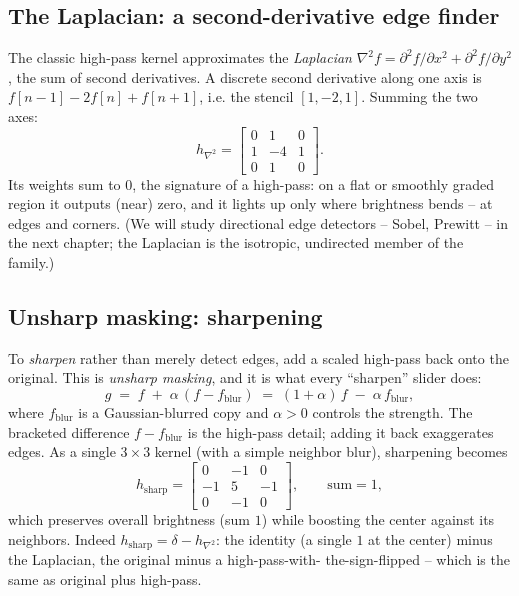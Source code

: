 \subsection{The Laplacian: a second-derivative edge finder}
The classic high-pass kernel approximates the \emph{Laplacian}
$\nabla^2 f = \partial^2 f/\partial x^2 + \partial^2 f/\partial y^2$, the sum of
second derivatives. A discrete second derivative along one axis is
$f[n-1] - 2f[n] + f[n+1]$, i.e. the stencil $[1,-2,1]$. Summing the two axes:
\[
h_{\nabla^2} = \begin{bmatrix} 0 & 1 & 0\\ 1 & -4 & 1\\ 0 & 1 & 0\end{bmatrix}.
\]
Its weights sum to $0$, the signature of a high-pass: on a flat or smoothly graded
region it outputs (near) zero, and it lights up only where brightness bends -- at
edges and corners. (We will study directional edge detectors -- Sobel, Prewitt --
in the next chapter; the Laplacian is the isotropic, undirected member of the
family.)

\subsection{Unsharp masking: sharpening}
To \emph{sharpen} rather than merely detect edges, add a scaled high-pass back onto
the original. This is \emph{unsharp masking}, and it is what every ``sharpen''
slider does:
\begin{equation}
g \;=\; f \;+\; \alpha\,(f - f_{\text{blur}})
\;=\; (1+\alpha)\,f \;-\; \alpha\, f_{\text{blur}},
\label{ch31:unsharp}
\end{equation}
where $f_{\text{blur}}$ is a Gaussian-blurred copy and $\alpha>0$ controls the
strength. The bracketed difference $f - f_{\text{blur}}$ is the high-pass detail;
adding it back exaggerates edges. As a single $3\times3$ kernel (with a simple
neighbor blur), sharpening becomes
\[
h_{\text{sharp}} = \begin{bmatrix} 0 & -1 & 0\\ -1 & 5 & -1\\ 0 & -1 & 0\end{bmatrix},
\qquad\text{sum} = 1,
\]
which preserves overall brightness (sum $1$) while boosting the center against its
neighbors. Indeed $h_{\text{sharp}} = \delta - h_{\nabla^2}$: the identity (a
single $1$ at the center) minus the Laplacian, the original minus a high-pass-with-
the-sign-flipped -- which is the same as original plus high-pass.

